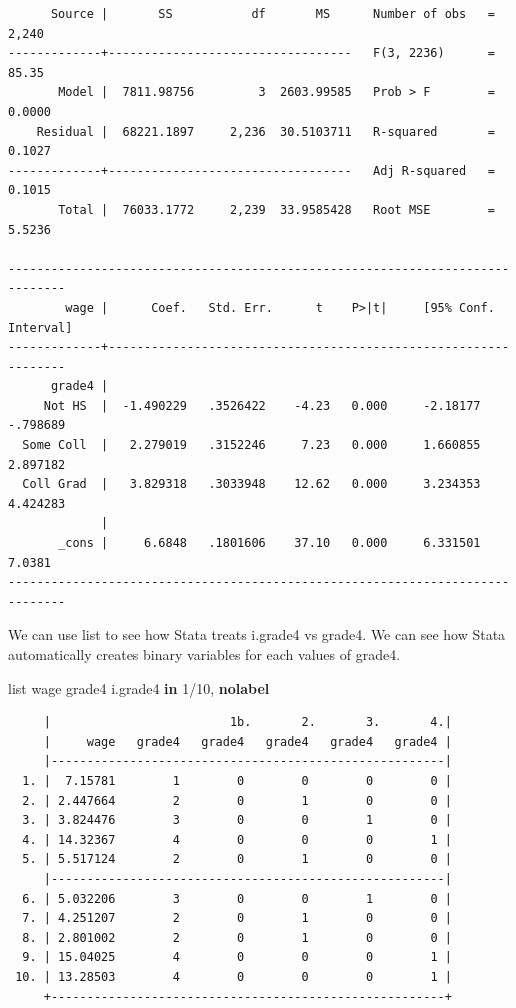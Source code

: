 \documentclass[
]{book}
\newenvironment{Shaded}{\begin{snugshade}}{\end{snugshade}}
\newcommand{\KeywordTok}[1]{\textcolor[rgb]{0.13,0.29,0.53}{\textbf{#1}}}
\newcommand{\NormalTok}[1]{#1}
\newcommand{\OtherTok}[1]{\textcolor[rgb]{0.56,0.35,0.01}{#1}}
\begin{document}
\begin{verbatim}
      Source |       SS           df       MS      Number of obs   =     2,240
-------------+----------------------------------   F(3, 2236)      =     85.35
       Model |  7811.98756         3  2603.99585   Prob > F        =    0.0000
    Residual |  68221.1897     2,236  30.5103711   R-squared       =    0.1027
-------------+----------------------------------   Adj R-squared   =    0.1015
       Total |  76033.1772     2,239  33.9585428   Root MSE        =    5.5236

------------------------------------------------------------------------------
        wage |      Coef.   Std. Err.      t    P>|t|     [95% Conf. Interval]
-------------+----------------------------------------------------------------
      grade4 |
     Not HS  |  -1.490229   .3526422    -4.23   0.000     -2.18177    -.798689
  Some Coll  |   2.279019   .3152246     7.23   0.000     1.660855    2.897182
  Coll Grad  |   3.829318   .3033948    12.62   0.000     3.234353    4.424283
             |
       _cons |     6.6848   .1801606    37.10   0.000     6.331501      7.0381
------------------------------------------------------------------------------
\end{verbatim}

We can use list to see how Stata treats i.grade4 vs grade4. We can see how Stata automatically creates binary variables for each values of grade4.

\begin{Shaded}
\begin{Highlighting}[]
\OtherTok{list}\NormalTok{ wage grade4 i.grade4 }\KeywordTok{in}\NormalTok{ 1/10, }\KeywordTok{nolabel}
\end{Highlighting}
\end{Shaded}

\begin{verbatim}
     |                         1b.       2.       3.       4.|
     |     wage   grade4   grade4   grade4   grade4   grade4 |
     |-------------------------------------------------------|
  1. |  7.15781        1        0        0        0        0 |
  2. | 2.447664        2        0        1        0        0 |
  3. | 3.824476        3        0        0        1        0 |
  4. | 14.32367        4        0        0        0        1 |
  5. | 5.517124        2        0        1        0        0 |
     |-------------------------------------------------------|
  6. | 5.032206        3        0        0        1        0 |
  7. | 4.251207        2        0        1        0        0 |
  8. | 2.801002        2        0        1        0        0 |
  9. | 15.04025        4        0        0        0        1 |
 10. | 13.28503        4        0        0        0        1 |
     +-------------------------------------------------------+
\end{verbatim}
\end{document}
